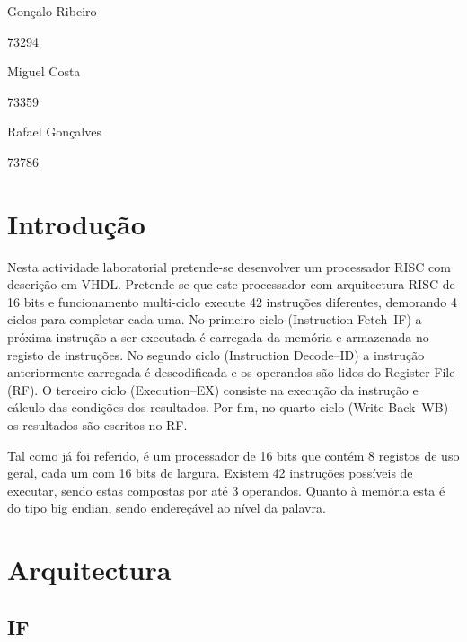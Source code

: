 \documentclass[a4paper]{article}
\begin{document}
	
	
	
	\trSetAuthors
		{
		Gonçalo Ribeiro
		
		73294
		}{
		Miguel Costa
		
		73359
		}{
		Rafael Gonçalves
		
		73786
		}
		
	
	\trMakeCover
	
	\tableofcontents
	\pagebreak
	
	\section{Introdução}
	
		Nesta actividade laboratorial pretende-se desenvolver um processador \textmu RISC com descrição em VHDL. Pretende-se que este processador com arquitectura RISC de 16 bits e funcionamento multi-ciclo execute 42 instruções diferentes, demorando 4 ciclos para completar cada uma. No primeiro ciclo (Instruction Fetch--IF) a próxima instrução a ser executada é carregada da memória e armazenada no registo de instruções. No segundo ciclo (Instruction Decode--ID) a instrução anteriormente carregada é descodificada e os operandos são lidos do Register File (RF). O terceiro ciclo (Execution--EX) consiste na execução da instrução e cálculo das condições dos resultados. Por fim, no quarto ciclo (Write Back--WB) os resultados são escritos no RF.
	
		Tal como já foi referido, é um processador de 16 bits que contém 8 registos de uso geral, cada um com 16 bits de largura. Existem 42 instruções possíveis de executar, sendo estas compostas por até 3 operandos. Quanto à memória esta é do tipo big endian, sendo endereçável ao nível da palavra.
	
	
	\section{Arquitectura}
	
		\subsection{IF}
\end{document}
